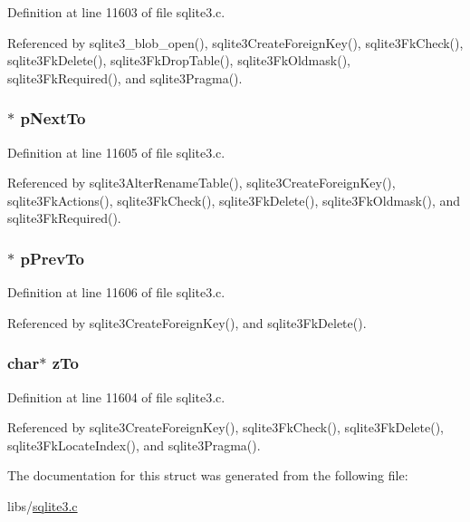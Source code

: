 Definition at line 11603 of file sqlite3.\+c.



Referenced by sqlite3\+\_\+blob\+\_\+open(), sqlite3\+Create\+Foreign\+Key(), sqlite3\+Fk\+Check(), sqlite3\+Fk\+Delete(), sqlite3\+Fk\+Drop\+Table(), sqlite3\+Fk\+Oldmask(), sqlite3\+Fk\+Required(), and sqlite3\+Pragma().

\hypertarget{struct_f_key_a667382be15447b434268f99968fedefc}{}
\subsubsection[{p\+Next\+To}]{$\ast$ p\+Next\+To}\label{struct_f_key_a667382be15447b434268f99968fedefc}


Definition at line 11605 of file sqlite3.\+c.



Referenced by sqlite3\+Alter\+Rename\+Table(), sqlite3\+Create\+Foreign\+Key(), sqlite3\+Fk\+Actions(), sqlite3\+Fk\+Check(), sqlite3\+Fk\+Delete(), sqlite3\+Fk\+Oldmask(), and sqlite3\+Fk\+Required().

\hypertarget{struct_f_key_a1e3a1d05b53abc60d688138e8ab4387e}{}
\subsubsection[{p\+Prev\+To}]{$\ast$ p\+Prev\+To}\label{struct_f_key_a1e3a1d05b53abc60d688138e8ab4387e}


Definition at line 11606 of file sqlite3.\+c.



Referenced by sqlite3\+Create\+Foreign\+Key(), and sqlite3\+Fk\+Delete().

\hypertarget{struct_f_key_a8b36f3339f6976ec3aa9fc2f8901ec2a}{}
\subsubsection[{z\+To}]{\setlength{\rightskip}{0pt plus 5cm}char$\ast$ z\+To}\label{struct_f_key_a8b36f3339f6976ec3aa9fc2f8901ec2a}


Definition at line 11604 of file sqlite3.\+c.



Referenced by sqlite3\+Create\+Foreign\+Key(), sqlite3\+Fk\+Check(), sqlite3\+Fk\+Delete(), sqlite3\+Fk\+Locate\+Index(), and sqlite3\+Pragma().



The documentation for this struct was generated from the following file\+:\begin{DoxyCompactItemize}
\item 
libs/\hyperlink{sqlite3_8c}{sqlite3.\+c}\end{DoxyCompactItemize}
